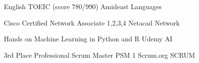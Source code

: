 


\begin{cvhonors}

  \cvhonor
    {} %
    {\hspace{1mm} English TOEIC (score 780/990)} %
    {Amideast} %
    {Languages} %

  \cvhonor
    {} %
    {\hspace{1mm} Cisco Certified Network Associate 1,2,3,4 } %
    {Netacad} %
    {Network} %

  \cvhonor
    {} %
    {\hspace{1mm}Hands on Machine Learning in Python and R} %
    {Udemy} %
    {AI} %

  \cvhonor
    {3rd Place} %
    {\hspace{1mm}Professional Scrum Master PSM 1} %
    {Scrum.org} %
    {SCRUM} %

\end{cvhonors}


